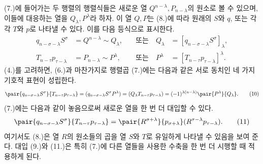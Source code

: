 
(7.)에 들어가는 두 행렬의 행렬식들은 새로운 열 $Q^{n-\lambda},P_{n-\lambda}$의 원소로 볼 수 있으며, 이들에 대응하는 열을 $Q_\lambda,P^\lambda$라 하자. 이 열 $Q,P$는 (8.)에 따라 원래의 $S$와 $q$, 또는 각각 $T$와 $p$로 나타낼 수 있다. 이를 다음 등식으로 표시한다.
\begin{equation}
\begin{aligned}
 q_{n-\sigma-\lambda}S^\sigma&=Q^{n-\lambda}\sim Q_\lambda, &\quad\text{또는}\quad Q_\lambda&=[q_{n-\sigma-\lambda}S^\sigma]_\lambda,\\
 T_{n-\tau}p_{\tau-\lambda}&=P_{n-\lambda}\sim P^\lambda, &\quad\text{또는}\quad P^\lambda&=[T_{n-\tau}p_{\tau-\lambda}]^\lambda.
\end{aligned}
\tag{9}
\end{equation}
(4.)를 고려하면, (6.)과 마찬가지로 행렬곱 (7.)에는 다음과 같은 서로 동치인 네 가지 기호적 표현이 성립한다.
\begin{equation}
\pair{q_{n-\sigma-\lambda}S^\sigma}{T_{n-\tau}p_{\tau-\lambda}}
=(q_{n-\sigma-\lambda}S^\sigma P^\lambda)=(Q_\lambda T_{n-\tau}p_{\tau-\lambda})=(-1)^{\lambda(n-\lambda)}\pair{P^\lambda}{Q_\lambda}.
\tag{10}
\end{equation}
(7.)에는 다음과 같이 놓음으로써 새로운 열을 한 번 더 대입할 수 있다.
\begin{equation}
 \pair{q_{n-\sigma-\lambda}S^\sigma}{T_{n-\tau}p_{\tau-\lambda}}
 =\pair{R^{\sigma+\lambda}}{p_{\sigma+\lambda}}(R^{\tau-\lambda}p_{\tau-\lambda}).
\tag{11}
\end{equation}
여기서도 (8.)은 열 $R$의 원소들의 곱을 열 $S$와 $T$로 유일하게 나타낼 수 있음을 보여 준다. 대입 (9.)와 (11.)은 특히 (7.)에 다른 열들을 사용한 수축을 한 번 더 시행할 때 적용하게 된다.
